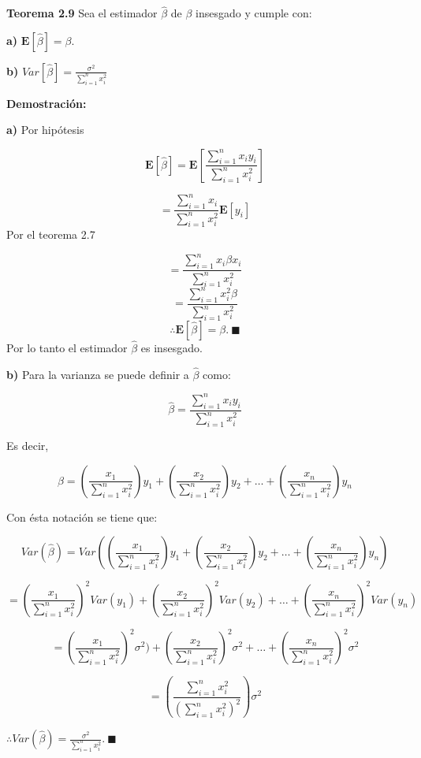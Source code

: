 \documentclass[a4paper,oneside,openany]{book}
\begin{document}
\textbf{Teorema 2.9} Sea el estimador \(\hat{\beta}\) de \(\beta\)
insesgado y cumple con:

\textbf{a)} \(\mathbf{E}\left[\hat{\beta}\right]=\beta.\)

\textbf{b)}
\(Var\left[ \hat{\beta}\right]=\frac{\sigma^2}{\sum_{i=1}^{n}x_{i}^2}\)

\textbf{Demostración:}

\textbf{a)} Por hipótesis

\[\mathbf{E}\left[\hat{\beta}\right]=\mathbf{E}\left[\frac{\sum_{i=1}^{n}x_{i}y_{i}}{\sum_{i=1}^{n}x_{i}^2}\right]\]

\[=\frac{\sum_{i=1}^{n}x_{i}}{{\sum_{i=1}^{n}x_{i}^2}}\mathbf{E}[y_{i}]\]
Por el teorema 2.7

\[=\frac{\sum_{i=1}^{n}x_{i}\beta x_{i}}{{\sum_{i=1}^{n}x_{i}^2}}\]
\[=\frac{\sum_{i=1}^{n}x_{i}^2\beta}{{\sum_{i=1}^{n}x_{i}^2}}\]
\[\therefore \mathbf{E}\left[\hat{\beta}\right]=\beta. \ \blacksquare\]
Por lo tanto el estimador \(\hat{\beta}\) es insesgado.

\textbf{b)} Para la varianza se puede definir a \(\hat{\beta}\) como:

\[\hat{\beta}=\frac{\sum_{i=1}^{n}x_{i}y_{i}}{\sum_{i=1}^{n}x_{i}^2}\]

Es decir,

\[\hat{\beta}=\left(\frac{x_{1}}{\sum_{i=1}^{n}x_{i}^2}\right)y_{1} + \left(\frac{x_{2}}{\sum_{i=1}^{n}x_{i}^2}\right)y_{2} + \ldots + \left(\frac{x_{n}}{\sum_{i=1}^{n}x_{i}^2}\right)y_{n}\]

Con ésta notación se tiene que:

\[Var\left(\hat{\beta}\right)=Var\left( \left(\frac{x_{1}}{\sum_{i=1}^{n}x_{i}^2}\right)y_{1} + \left(\frac{x_{2}}{\sum_{i=1}^{n}x_{i}^2}\right)y_{2} + \ldots + \left(\frac{x_{n}}{\sum_{i=1}^{n}x_{i}^2}\right)y_{n} \right)\]

\[=\left(\frac{x_{1}}{\sum_{i=1}^{n}x_{i}^2}\right)^2Var(y_{1}) + \left(\frac{x_{2}}{\sum_{i=1}^{n}x_{i}^2}\right)^2Var(y_{2}) + \ldots + \left(\frac{x_{n}}{\sum_{i=1}^{n}x_{i}^2}\right)^2Var(y_{n})\]

\[=\left(\frac{x_{1}}{\sum_{i=1}^{n}x_{i}^2}\right)^2\sigma^2) + \left(\frac{x_{2}}{\sum_{i=1}^{n}x_{i}^2}\right)^2\sigma^2 + \ldots + \left(\frac{x_{n}}{\sum_{i=1}^{n}x_{i}^2}\right)^2\sigma^2\]

\[=\left(\frac{\sum_{i=1}^{n}x_{i}^2}{(\sum_{i=1}^{n}x_{i}^2)^2}\right)\sigma^2\]

\(\therefore Var\left( \hat{\beta}\right)=\frac{\sigma^2}{\sum_{i=1}^{n}x_{i}^2}. \ \blacksquare\)
\end{document}
